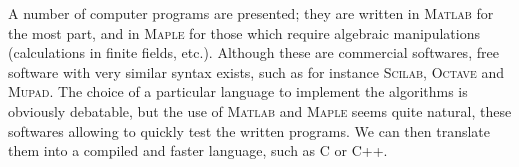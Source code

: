 

  A number of computer programs are presented; they are written in \textsc{Matlab} for the most part, and in \textsc{Maple} for those which require algebraic manipulations (calculations in finite fields, etc.). Although these are commercial softwares, free software with very similar syntax exists, such as for instance \textsc{Scilab}, \textsc{Octave} and \textsc{Mupad}. 
% 
The choice of a particular language to implement the algorithms is obviously debatable, but the use of \textsc{Matlab} and \textsc{Maple} seems quite natural, these softwares allowing to quickly test the written programs. We can then translate them into a compiled and faster language, such as C or C++. 
%
%



